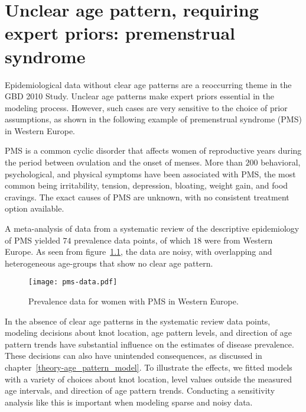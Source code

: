 \chapter{Unclear age pattern, requiring expert priors: premenstrual syndrome}
\label{applications-priors_knots_select}

Epidemiological data without clear age patterns are a reoccurring
theme in the GBD 2010 Study.  Unclear age patterns make expert priors
essential in the modeling process.  However, such cases are very
sensitive to the choice of prior assumptions, as shown in the
following example of premenstrual syndrome (PMS) in Western Europe.

PMS is a common cyclic disorder that affects women of reproductive
years during the period between ovulation and the onset of menses.
More than $200$ behavioral, psychological, and physical symptoms have been
associated with PMS, the most common being irritability, tension,
depression, bloating, weight gain, and food cravings.  The exact causes
of PMS are unknown, with no consistent
treatment option available. \cite{dickerson_premenstrual_2003, singh_incidence_1998,
  goodale_alleviation_1990}

A meta-analysis of data from a systematic review of the descriptive
epidemiology of PMS yielded $74$ prevalence
data points, of which $18$ were from Western Europe.  As seen from
figure~\ref{fig:app-pms_data}, the data are noisy, with overlapping and
heterogeneous age-groups that show no clear age pattern.

    \begin{figure}[h]
        \begin{center}
            \texttt{[image: pms-data.pdf]}
            \caption{Prevalence data for women with PMS
              in Western Europe.}
        \end{center}
        \label{fig:app-pms_data}
    \end{figure}


In the absence of clear age patterns in the systematic review data
points, modeling decisions about knot location, age pattern levels, and
direction of age pattern trends have substantial influence on the estimates of
disease prevalence.  These decisions can also have unintended
consequences, as discussed in chapter~\ref{theory-age_pattern_model}.
To illustrate the effects, we fitted models with a variety of choices
about knot location, level values outside the measured age
intervals, and direction of age pattern trends.  Conducting a sensitivity analysis
like this is important when modeling sparse and noisy data.

